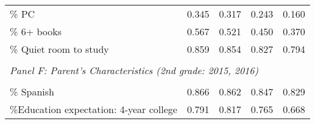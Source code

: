 {\begin{tabular}{lcccc}
\% PC       &       0.345&       0.317&       0.243&       0.160\\
\% 6+ books &       0.567&       0.521&       0.450&       0.370\\
\% Quiet room to study&       0.859&       0.854&       0.827&       0.794\\
&  &  &   \\
\multicolumn{4}{l}{\textit{Panel F: Parent's Characteristics (2nd grade: 2015, 2016)}} \\
            &            &            &            &            \\
\% Spanish  &       0.866&       0.862&       0.847&       0.829\\
\%Education expectation: 4-year college&       0.791&       0.817&       0.765&       0.668\\

\bottomrule
\end{tabular}
}
